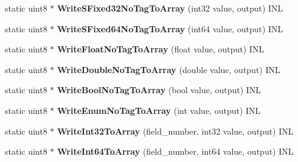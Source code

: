 \begin{DoxyCompactItemize}
static uint8 $\ast$ {\bfseries Write\+S\+Fixed32\+No\+Tag\+To\+Array} (int32 value, output) I\+NL
\item 
\mbox{\label{classgoogle_1_1protobuf_1_1internal_1_1WireFormatLite_a1c6855ded0a01ef1d8e1ff1bada71039}} 
static uint8 $\ast$ {\bfseries Write\+S\+Fixed64\+No\+Tag\+To\+Array} (int64 value, output) I\+NL
\item 
\mbox{\label{classgoogle_1_1protobuf_1_1internal_1_1WireFormatLite_a3ef7b0f8c7ded7561f3bb3f88adf60e5}} 
static uint8 $\ast$ {\bfseries Write\+Float\+No\+Tag\+To\+Array} (float value, output) I\+NL
\item 
\mbox{\label{classgoogle_1_1protobuf_1_1internal_1_1WireFormatLite_aab46110d9e33898937b2670b46a8415d}} 
static uint8 $\ast$ {\bfseries Write\+Double\+No\+Tag\+To\+Array} (double value, output) I\+NL
\item 
\mbox{\label{classgoogle_1_1protobuf_1_1internal_1_1WireFormatLite_a24eebce4470ee72ccbd8e52d21e13f17}} 
static uint8 $\ast$ {\bfseries Write\+Bool\+No\+Tag\+To\+Array} (bool value, output) I\+NL
\item 
\mbox{\label{classgoogle_1_1protobuf_1_1internal_1_1WireFormatLite_a60bba99034d76cf9c38950dd8d3edd1f}} 
static uint8 $\ast$ {\bfseries Write\+Enum\+No\+Tag\+To\+Array} (int value, output) I\+NL
\item 
\mbox{\label{classgoogle_1_1protobuf_1_1internal_1_1WireFormatLite_a0e71653393842ca3e8421ed2c01323fe}} 
static uint8 $\ast$ {\bfseries Write\+Int32\+To\+Array} (field\+\_\+number, int32 value, output) I\+NL
\item 
\mbox{\label{classgoogle_1_1protobuf_1_1internal_1_1WireFormatLite_accc3eb2ed28d9df47ad423b7b6c0aaa6}} 
static uint8 $\ast$ {\bfseries Write\+Int64\+To\+Array} (field\+\_\+number, int64 value, output) I\+NL
\item 
\mbox{\label{classgoogle_1_1protobuf_1_1internal_1_1WireFormatLite_afaee5e7f83029170e7e40f318505c0ff}} 

\end{DoxyCompactItemize}
